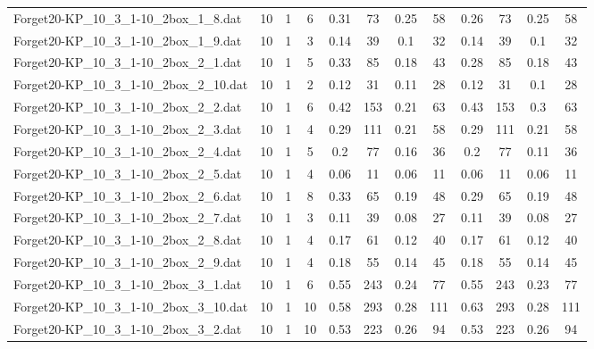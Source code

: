 \begin{sidewaystable}[!ht]
{\begin{tabular}{lccccccccccc}
Forget20-KP\_10\_3\_1-10\_2box\_1\_8.dat & 10 & 1 & 6 & 0.31 & 73 &  \textcolor{blue2}{0.25} & 58 & 0.26 & 73 &  \textcolor{blue2}{0.25} & 58 \\
Forget20-KP\_10\_3\_1-10\_2box\_1\_9.dat & 10 & 1 & 3 & 0.14 & 39 &  \textcolor{blue2}{0.1} & 32 & 0.14 & 39 &  \textcolor{blue2}{0.1} & 32 \\
Forget20-KP\_10\_3\_1-10\_2box\_2\_1.dat & 10 & 1 & 5 & 0.33 & 85 &  \textcolor{blue2}{0.18} & 43 & 0.28 & 85 &  \textcolor{blue2}{0.18} & 43 \\
Forget20-KP\_10\_3\_1-10\_2box\_2\_10.dat & 10 & 1 & 2 & 0.12 & 31 & 0.11 & 28 & 0.12 & 31 &  \textcolor{blue2}{0.1} & 28 \\
Forget20-KP\_10\_3\_1-10\_2box\_2\_2.dat & 10 & 1 & 6 & 0.42 & 153 & 0.21 & 63 & 0.43 & 153 & 0.3 & 63 \\
Forget20-KP\_10\_3\_1-10\_2box\_2\_3.dat & 10 & 1 & 4 & 0.29 & 111 & 0.21 & 58 & 0.29 & 111 & 0.21 & 58 \\
Forget20-KP\_10\_3\_1-10\_2box\_2\_4.dat & 10 & 1 & 5 & 0.2 & 77 & 0.16 & 36 & 0.2 & 77 &  \textcolor{blue2}{0.11} & 36 \\
Forget20-KP\_10\_3\_1-10\_2box\_2\_5.dat & 10 & 1 & 4 &  \textcolor{blue2}{0.06} & 11 &  \textcolor{blue2}{0.06} & 11 &  \textcolor{blue2}{0.06} & 11 &  \textcolor{blue2}{0.06} & 11 \\
Forget20-KP\_10\_3\_1-10\_2box\_2\_6.dat & 10 & 1 & 8 & 0.33 & 65 &  \textcolor{blue2}{0.19} & 48 & 0.29 & 65 &  \textcolor{blue2}{0.19} & 48 \\
Forget20-KP\_10\_3\_1-10\_2box\_2\_7.dat & 10 & 1 & 3 & 0.11 & 39 &  \textcolor{blue2}{0.08} & 27 & 0.11 & 39 &  \textcolor{blue2}{0.08} & 27 \\
Forget20-KP\_10\_3\_1-10\_2box\_2\_8.dat & 10 & 1 & 4 & 0.17 & 61 &  \textcolor{blue2}{0.12} & 40 & 0.17 & 61 &  \textcolor{blue2}{0.12} & 40 \\
Forget20-KP\_10\_3\_1-10\_2box\_2\_9.dat & 10 & 1 & 4 & 0.18 & 55 &  \textcolor{blue2}{0.14} & 45 & 0.18 & 55 &  \textcolor{blue2}{0.14} & 45 \\
Forget20-KP\_10\_3\_1-10\_2box\_3\_1.dat & 10 & 1 & 6 & 0.55 & 243 & 0.24 & 77 & 0.55 & 243 &  \textcolor{blue2}{0.23} & 77 \\
Forget20-KP\_10\_3\_1-10\_2box\_3\_10.dat & 10 & 1 & 10 & 0.58 & 293 &  \textcolor{blue2}{0.28} & 111 & 0.63 & 293 &  \textcolor{blue2}{0.28} & 111 \\
Forget20-KP\_10\_3\_1-10\_2box\_3\_2.dat & 10 & 1 & 10 & 0.53 & 223 & 0.26 & 94 & 0.53 & 223 & 0.26 & 94 \\

\end{tabular}}
\end{sidewaystable}
